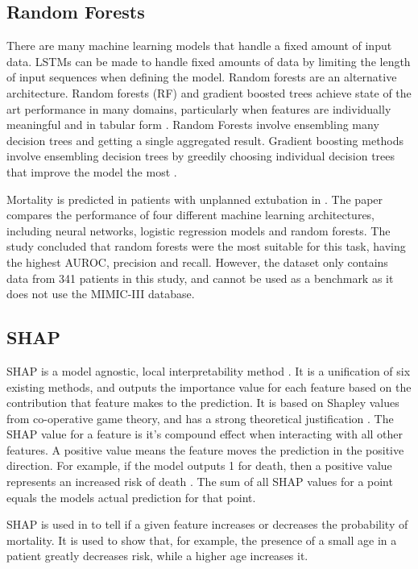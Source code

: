 \documentclass[12pt]{article}
\begin{document}
\subsection{Random Forests}
There are many machine learning models that handle a fixed amount of input data. LSTMs can be made to handle fixed amounts of data by limiting the length of input sequences when defining the model. 
Random forests are an alternative architecture. Random forests (RF) and gradient boosted trees achieve state of the art performance in many domains, particularly when features are individually meaningful and in tabular form \cite{TreeExplainer}. Random Forests involve ensembling many decision trees and getting a single aggregated result. Gradient boosting methods involve ensembling decision trees by greedily choosing individual decision trees that improve the model the most \cite{XGBoost}.

Mortality is predicted in patients with unplanned extubation in \cite{CompareFourML}. The paper compares the performance of four different machine learning architectures, including neural networks, logistic regression models and random forests. The study concluded that random forests were the most suitable for this task, having the highest AUROC, precision and recall. However, the dataset only contains data from 341 patients in this study, and cannot be used as a benchmark as it does not use the MIMIC-III database. 

\subsection{SHAP}
\label{SHAP Intro}
SHAP is a model agnostic, local interpretability method \cite{SHAP}. It is a unification of six existing methods, and outputs the importance value for each feature based on the contribution that feature makes to the prediction. It is based on Shapley values from co-operative game theory, and has a strong theoretical justification \cite{YoungKyle2019Dnno,ICUFancyLSTM}. The SHAP value for a feature is it's compound effect when interacting with all other features. A positive value means the feature moves the prediction in the positive direction. For example, if the model outputs 1 for death, then a positive value represents an increased risk of death \cite{SHAPInteraction}. The sum of all SHAP values for a point equals the models actual prediction for that point.

SHAP is used in \cite{ICUFancyLSTM} to tell if a given feature increases or decreases the probability of mortality. It is used to show that, for example, the presence of a small age in a patient greatly decreases risk, while a higher age increases it. 
\end{document}
